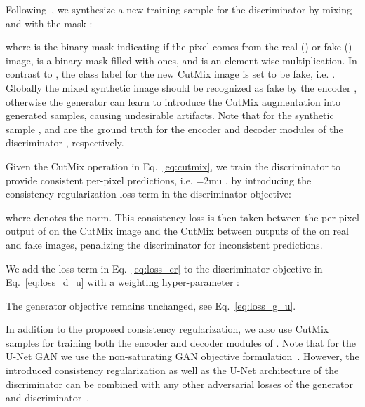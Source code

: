 \documentclass[10pt,twocolumn,letterpaper]{article}
\begin{document}
Following~\cite{Yun2019CutMixRS}, we
synthesize a new training sample  for the discriminator  by mixing  and  with the mask :

where  is the binary mask indicating if the pixel  comes from the real () or fake () image,  is a binary mask filled with ones, and  is an element-wise multiplication.
In contrast to \cite{Yun2019CutMixRS}, the class label  for the new CutMix image  is set to be fake, i.e. . Globally the mixed synthetic image should be recognized as fake by the encoder , otherwise the generator can learn to introduce the CutMix augmentation
into generated samples, causing undesirable artifacts.
Note that for the synthetic sample ,  and  are the ground truth for the encoder and decoder modules of the discriminator , respectively.




Given the CutMix operation in Eq.~\ref{eq:cutmix}, we train the discriminator to provide consistent per-pixel predictions, i.e.
{\thickmuskip=2mu }, by introducing the consistency regularization loss term in the discriminator objective:

where denotes  the  norm.
This consistency loss is then taken between the per-pixel output of  on the
CutMix image and the CutMix between outputs of the  on real and fake images, penalizing the discriminator for inconsistent predictions.

We add the loss term in Eq.~\ref{eq:loss_cr} to the discriminator objective in Eq.~\ref{eq:loss_d_u} with a weighting hyper-parameter :

The generator objective  remains unchanged, see Eq.~\ref{eq:loss_g_u}.

In addition to the proposed consistency regularization, we also use CutMix samples for training both the encoder and decoder modules of .  Note that for the U-Net GAN we use the non-saturating GAN objective formulation~\cite{goodfellow2014generative}. However, the introduced consistency regularization as well as the U-Net architecture of the discriminator can be combined with any other adversarial losses of the generator and discriminator~\cite{Arjovsky2017WGAN,Lim2017GeometricG,Nowozin2016fGANTG}.
\end{document}

